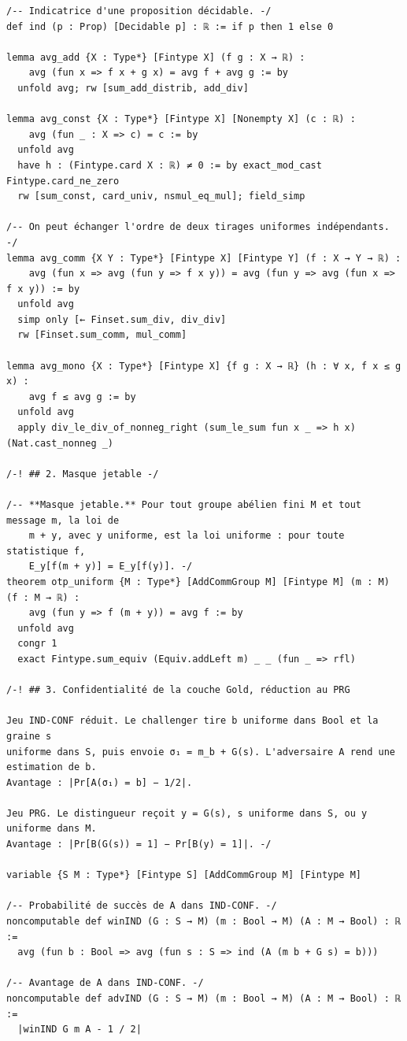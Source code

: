 \begin{lstlisting}[caption={M\'ecanisation r\'eduite des r\'eductions de SOTP-Low (version 1.0)}, label={lst:gamebased_lean}, language=Lean4]
/-- Indicatrice d'une proposition décidable. -/
def ind (p : Prop) [Decidable p] : ℝ := if p then 1 else 0

lemma avg_add {X : Type*} [Fintype X] (f g : X → ℝ) :
    avg (fun x => f x + g x) = avg f + avg g := by
  unfold avg; rw [sum_add_distrib, add_div]

lemma avg_const {X : Type*} [Fintype X] [Nonempty X] (c : ℝ) :
    avg (fun _ : X => c) = c := by
  unfold avg
  have h : (Fintype.card X : ℝ) ≠ 0 := by exact_mod_cast Fintype.card_ne_zero
  rw [sum_const, card_univ, nsmul_eq_mul]; field_simp

/-- On peut échanger l'ordre de deux tirages uniformes indépendants. -/
lemma avg_comm {X Y : Type*} [Fintype X] [Fintype Y] (f : X → Y → ℝ) :
    avg (fun x => avg (fun y => f x y)) = avg (fun y => avg (fun x => f x y)) := by
  unfold avg
  simp only [← Finset.sum_div, div_div]
  rw [Finset.sum_comm, mul_comm]

lemma avg_mono {X : Type*} [Fintype X] {f g : X → ℝ} (h : ∀ x, f x ≤ g x) :
    avg f ≤ avg g := by
  unfold avg
  apply div_le_div_of_nonneg_right (sum_le_sum fun x _ => h x) (Nat.cast_nonneg _)

/-! ## 2. Masque jetable -/

/-- **Masque jetable.** Pour tout groupe abélien fini M et tout message m, la loi de
    m + y, avec y uniforme, est la loi uniforme : pour toute statistique f,
    E_y[f(m + y)] = E_y[f(y)]. -/
theorem otp_uniform {M : Type*} [AddCommGroup M] [Fintype M] (m : M) (f : M → ℝ) :
    avg (fun y => f (m + y)) = avg f := by
  unfold avg
  congr 1
  exact Fintype.sum_equiv (Equiv.addLeft m) _ _ (fun _ => rfl)

/-! ## 3. Confidentialité de la couche Gold, réduction au PRG

Jeu IND-CONF réduit. Le challenger tire b uniforme dans Bool et la graine s
uniforme dans S, puis envoie σ₁ = m_b + G(s). L'adversaire A rend une estimation de b.
Avantage : |Pr[A(σ₁) = b] − 1/2|.

Jeu PRG. Le distingueur reçoit y = G(s), s uniforme dans S, ou y uniforme dans M.
Avantage : |Pr[B(G(s)) = 1] − Pr[B(y) = 1]|. -/

variable {S M : Type*} [Fintype S] [AddCommGroup M] [Fintype M]

/-- Probabilité de succès de A dans IND-CONF. -/
noncomputable def winIND (G : S → M) (m : Bool → M) (A : M → Bool) : ℝ :=
  avg (fun b : Bool => avg (fun s : S => ind (A (m b + G s) = b)))

/-- Avantage de A dans IND-CONF. -/
noncomputable def advIND (G : S → M) (m : Bool → M) (A : M → Bool) : ℝ :=
  |winIND G m A - 1 / 2|


\end{lstlisting}
